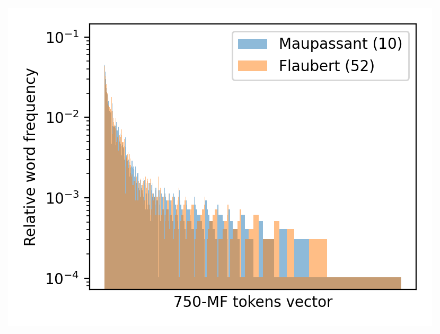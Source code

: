 \begin{figure}
  \label{fig:mf_vector_error_1}
  \includegraphics[width=\linewidth]{img/mf_vector_error_1.png}
\end{figure}

